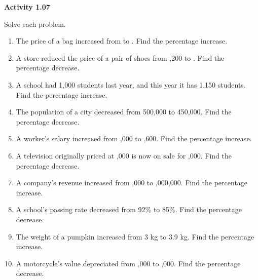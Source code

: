 \vspace{0.3ex}
\noindent\textbf{Activity 1.07}

\vspace{0.2ex}

Solve each problem.
\begin{enumerate}
    \item The price of a bag increased from  to . Find the percentage increase.
    \item A store reduced the price of a pair of shoes from ,200 to . Find the percentage decrease.
    \item A school had 1,000 students last year, and this year it has 1,150 students. Find the percentage increase.
    \item The population of a city decreased from 500,000 to 450,000. Find the percentage decrease.
    \item A worker's salary increased from ,000 to ,600. Find the percentage increase.
    \item A television originally priced at ,000 is now on sale for ,000. Find the percentage decrease.
    \item A company’s revenue increased from ,000 to ,000,000. Find the percentage increase.
    \item A school's passing rate decreased from 92\% to 85\%. Find the percentage decrease.
    \item The weight of a pumpkin increased from 3 kg to 3.9 kg. Find the percentage increase.
    \item A motorcycle’s value depreciated from ,000 to ,000. Find the percentage decrease.
\end{enumerate}
